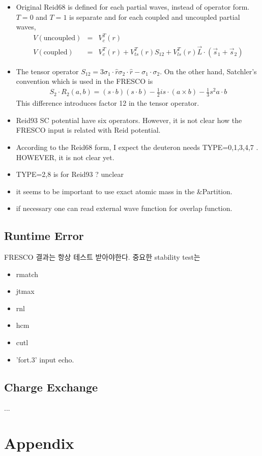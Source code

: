 \documentclass[11pt]{book}
\newcommand{\bea}{\begin{eqnarray}}
\newcommand{\eea}{\end{eqnarray}}
\newcommand{\no}{\nonumber \\}
\begin{document}
\begin{itemize}
\item Original Reid68 is defined for each partial waves,
      instead of operator form. $T=0$ and $T=1$ is separate and for each 
      coupled and uncoupled partial waves,
      \bea 
      V(\mbox{uncoupled})&=& V_c^T(r) \no 
      V(\mbox{coupled})&=& V_c^T(r)+V_{ts}^T(r) S_{12} + V_{ls}^T(r) {\vec L}\cdot({\vec s}_1+{\vec s}_2) 
      \eea 
\item The tensor operator $S_{12}=3\sigma_1\cdot\hat{r}\sigma_2\cdot\hat{r}-\sigma_1\cdot\sigma_2$.
      On the other hand, Satchler's convention which is used in the FRESCO is
      \bea 
       S_2\cdot R_2(a,b)=(s\cdot b)(s\cdot b)-\frac{1}{2}i s\cdot(a\times b)-\frac{1}{3}s^2 a\cdot b
      \eea 
      This difference introduces factor 12 in the tensor operator. 
\item Reid93 SC potential have six operators. However, it is not clear 
    how the FRESCO input is related with Reid potential. 
\item According to the Reid68 form, I expect the deuteron needs
     TYPE=0,1,3,4,7 . HOWEVER, it is not clear yet.
\item TYPE=2,8 is for Reid93 ? unclear
\item it seems to be important to use exact atomic mass in the \&Partition.
\item if necessary one can read external wave function for overlap function.           
\end{itemize}


\section{Runtime Error}
FRESCO 결과는 항상 테스트 받아야한다. 중요한 stability test는 
\begin{itemize}
\item rmatch
\item jtmax
\item rnl
\item hcm
\item cutl
\item 'fort.3' input echo.
\end{itemize}


\section{Charge Exchange}
...

\chapter{Appendix}
\end{document}
